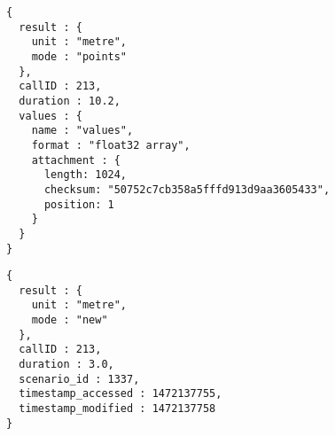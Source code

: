 \begin{lstlisting}[caption={A qua-compliant service output for mode \texttt{points}}, label={lst:quacompliantresult:points}]
{
  result : {
    unit : "metre",
    mode : "points"
  },
  callID : 213,
  duration : 10.2,
  values : {
    name : "values",
    format : "float32 array",
    attachment : {
      length: 1024,
      checksum: "50752c7cb358a5fffd913d9aa3605433",
      position: 1
    }
  }
}
\end{lstlisting}

\begin{lstlisting}[caption={A qua-compliant service output for mode \texttt{new}}, label={lst:quacompliantresult:new}]
{
  result : {
    unit : "metre",
    mode : "new"
  },
  callID : 213,
  duration : 3.0,
  scenario_id : 1337,
  timestamp_accessed : 1472137755,
  timestamp_modified : 1472137758
}
\end{lstlisting}

\clearpage
